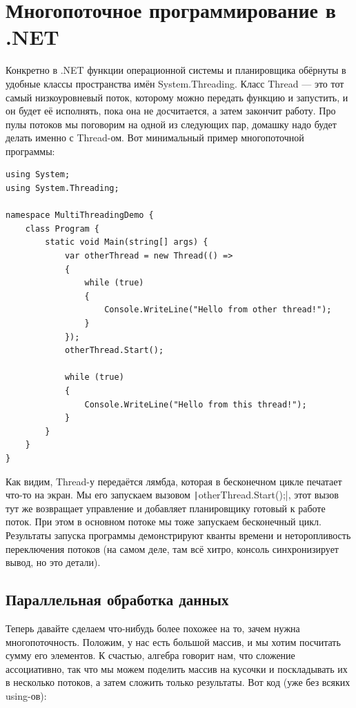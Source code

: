 \documentclass[a5paper]{article}
\begin{document}
\section{Многопоточное программирование в .NET}

Конкретно в .NET функции операционной системы и планировщика обёрнуты в удобные классы пространства имён System.Threading. Класс Thread --- это тот самый низкоуровневый поток, которому можно передать функцию и запустить, и он будет её исполнять, пока она не досчитается, а затем закончит работу. Про пулы потоков мы поговорим на одной из следующих пар, домашку надо будет делать именно с Thread-ом. Вот минимальный пример многопоточной программы:

\begin{verbatim}
using System;
using System.Threading;

namespace MultiThreadingDemo {
    class Program {
        static void Main(string[] args) {
            var otherThread = new Thread(() => 
            {
                while (true)
                {
                    Console.WriteLine("Hello from other thread!");
                }
            });
            otherThread.Start();

            while (true)
            {
                Console.WriteLine("Hello from this thread!");
            }
        }
    }
}
\end{verbatim}

Как видим, Thread-у передаётся лямбда, которая в бесконечном цикле печатает что-то на экран. Мы его запускаем вызовом \texttt|otherThread.Start();|, этот вызов тут же возвращает управление и добавляет планировщику готовый к работе поток. При этом в основном потоке мы тоже запускаем бесконечный цикл. Результаты запуска программы демонстрируют кванты времени и неторопливость переключения потоков (на самом деле, там всё хитро, консоль синхронизирует вывод, но это детали).

\subsection{Параллельная обработка данных}

Теперь давайте сделаем что-нибудь более похожее на то, зачем нужна многопоточность. Положим, у нас есть большой массив, и мы хотим посчитать сумму его элементов. К счастью, алгебра говорит нам, что сложение ассоциативно, так что мы можем поделить массив на кусочки и поскладывать их в несколько потоков, а затем сложить только результаты. Вот код (уже без всяких using-ов):
\end{document}
